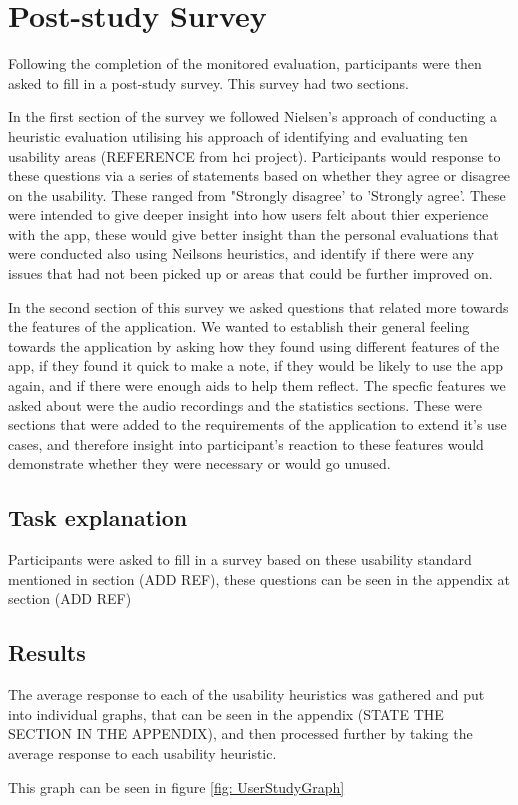 \documentclass{l4proj}
\begin{document}
\section{Post-study Survey}
Following the completion of the monitored evaluation, participants were then asked to fill in a post-study survey. This
survey had two sections.
\par 
In the first section of the survey we followed Nielsen’s approach of conducting a heuristic evaluation
utilising his approach of identifying and evaluating ten usability areas (REFERENCE from hci project).
Participants would response to these questions via a series of statements based on whether they agree or disagree on the 
usability. These ranged from "Strongly disagree' to 'Strongly agree'. These were intended to give deeper insight
into how users felt about thier experience with the app, these would give better insight than the personal evaluations
that were conducted also using Neilsons heuristics, and identify if there were any issues that had not been picked up or areas
that could be further improved on. 
\par 
In the second section of this survey we asked questions that related more towards the features of the application. We wanted
to establish their general feeling towards the application by asking how they found using different features of the app,
if they found it quick to make a note, if they would be likely to use the app again, and if there were enough aids to help
them reflect. The specfic features we asked about were the audio recordings and the statistics sections. These were sections
that were added to the requirements of the application to extend it's use cases, and therefore insight into participant's reaction 
to these features would demonstrate whether they were necessary or would go unused. 

\subsection{Task explanation}

Participants were asked to fill in a survey based on these usability standard mentioned in section (ADD REF), these questions
can be seen in the appendix at section (ADD REF)

\subsection{Results}
 
The average response to each of the usability heuristics was gathered and put into individual graphs, that can be seen in the appendix
(STATE THE SECTION IN THE APPENDIX), and then processed further by taking the average response to each usability heuristic.
\par 
This graph can be seen in figure \ref{fig: UserStudyGraph}
\end{document}
